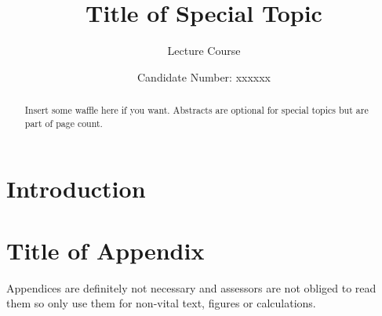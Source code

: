 \documentclass[12pt,a4paper]{article}
\title{Title of Special Topic}
\author{Lecture Course}
\date{Candidate Number: xxxxxx}
\begin{document}
\maketitle

\thispagestyle{empty}

\newpage
\setcounter{page}{1}



\begin{abstract}
  Insert some waffle here if you want. Abstracts are optional for
  special topics but are part of page count.
\end{abstract}

\section{Introduction}





\appendix

\section{Title of Appendix}

Appendices are definitely not necessary and assessors are not obliged to read them so only use them for non-vital text, figures or calculations.
\end{document}
